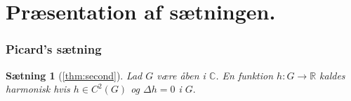 \documentclass{beamer}
\theoremstyle{plain}
\newtheorem{thm}{Sætning}[section]
\begin{document}
\section{Præsentation af sætningen.}
\begin{frame}
\frametitle{Picard's sætning}

\begin{thm}[\ref{thm:second}]
Lad $G$ være åben i $\mathbb{C}$. En funktion $h:G\to \mathbb{R}$ kaldes 
harmonisk hvis $h\in C^2(G)$ og $\Delta h=0$ i $G.$ 
\end{thm}

\end{frame}
\end{document}
